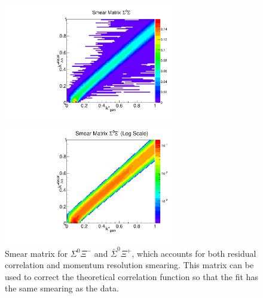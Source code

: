 \begin{figure}[ht]
\begin{minipage}{17.5pc}
\includegraphics[width=17.5pc]{Figures/SmearMatrices/2016-7-19-SmearMatrixSigmaXiCNormLLAA.pdf}
\end{minipage}\hspace{0.5pc}
\begin{minipage}{17.5pc}
\includegraphics[width=17.5pc]{Figures/SmearMatrices/2016-7-19-SmearMatrixSigmaXiCNormLLAALog.pdf}
\end{minipage} 
\caption[Smear matrix -- $\Sigma^0\Xi^{-}$ and $\bar{\Sigma}^0\Xi^{+}$]{
Smear matrix for $\Sigma^0\Xi^{-}$ and $\bar{\Sigma}^0\Xi^{+}$, which accounts for both residual correlation and momentum resolution smearing. This matrix can be used to correct the theoretical correlation function so that the fit has the same smearing as the data.
}
\end{figure}


